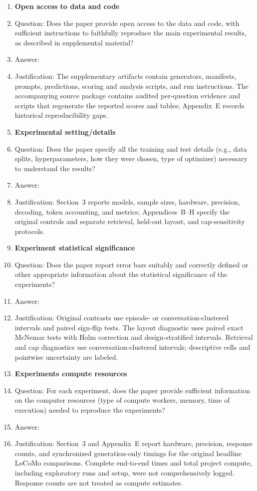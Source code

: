 \begin{enumerate}
\item {\bf Open access to data and code}
    \item[] Question: Does the paper provide open access to the data and code, with sufficient instructions to faithfully reproduce the main experimental results, as described in supplemental material?
    \item[] Answer: \answerYes{}
    \item[] Justification: The supplementary artifacts contain generators, manifests, prompts, predictions, scoring and analysis scripts, and run instructions. The accompanying source package contains audited per-question evidence and scripts that regenerate the reported scores and tables; Appendix~E records historical reproducibility gaps.

\item {\bf Experimental setting/details}
    \item[] Question: Does the paper specify all the training and test details (e.g., data splits, hyperparameters, how they were chosen, type of optimizer) necessary to understand the results?
    \item[] Answer: \answerYes{}
    \item[] Justification: Section~3 reports models, sample sizes, hardware, precision, decoding, token accounting, and metrics; Appendices~B--H specify the original controls and separate retrieval, held-out layout, and cap-sensitivity protocols.

\item {\bf Experiment statistical significance}
    \item[] Question: Does the paper report error bars suitably and correctly defined or other appropriate information about the statistical significance of the experiments?
    \item[] Answer: \answerYes{}
    \item[] Justification: Original contrasts use episode- or conversation-clustered intervals and paired sign-flip tests. The layout diagnostic uses paired exact McNemar tests with Holm correction and design-stratified intervals. Retrieval and cap diagnostics use conversation-clustered intervals; descriptive cells and pointwise uncertainty are labeled.

\item {\bf Experiments compute resources}
    \item[] Question: For each experiment, does the paper provide sufficient information on the computer resources (type of compute workers, memory, time of execution) needed to reproduce the experiments?
    \item[] Answer: \answerNo{}
    \item[] Justification: Section~3 and Appendix~E report hardware, precision, response counts, and synchronized generation-only timings for the original headline LoCoMo comparisons. Complete end-to-end times and total project compute, including exploratory runs and setup, were not comprehensively logged. Response counts are not treated as compute estimates.
    

\end{enumerate}
